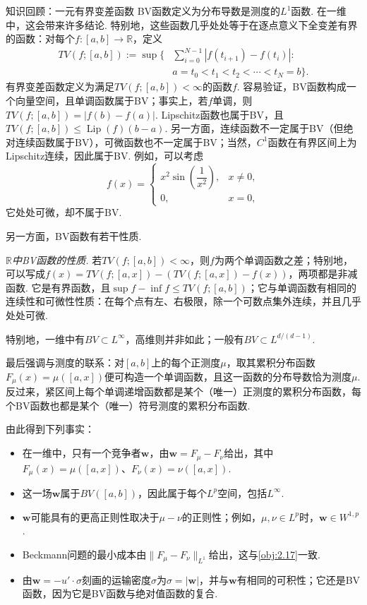 \begin{sourcebox}{知识回顾：一元有界变差函数}\label{box:4.4}
BV函数定义为分布导数是测度的$L^1$函数. 在一维中，这会带来许多结论. 特别地，这些函数几乎处处等于在逐点意义下全变差有界的函数：对每个$f:[a,b]\to\mathbb R$，定义
\begin{equation*}
\begin{aligned}
 TV(f;[a,b]):=\sup\biggl\{&\sum_{i=0}^{N-1}|f(t_{i+1})-f(t_i)|:\\
      &a=t_0<t_1<t_2<\cdots<t_N=b\biggr\}.
\end{aligned}
\end{equation*}
有界变差函数定义为满足$TV(f;[a,b])<\infty$的函数$f$. 容易验证，BV函数构成一个向量空间，且单调函数属于BV；事实上，若$f$单调，则$TV(f;[a,b])=|f(b)-f(a)|$. Lipschitz函数也属于BV，且$TV(f;[a,b])\leq\operatorname{Lip}(f)(b-a)$. 另一方面，连续函数不一定属于BV（但绝对连续函数属于BV），可微函数也不一定属于BV；当然，$C^1$函数在有界区间上为Lipschitz连续，因此属于BV. 例如，可以考虑
\[
 f(x)=\begin{cases}
 x^2\sin\left(\dfrac1{x^2}\right),&x\neq0,\\
 0,&x=0,
 \end{cases}
\]
它处处可微，却不属于BV.

另一方面，BV函数有若干性质.

\emph{$\mathbb R$中BV函数的性质.} 若$TV(f;[a,b])<\infty$，则$f$为两个单调函数之差；特别地，可以写成$f(x)=TV(f;[a,x])-(TV(f;[a,x])-f(x))$，两项都是非减函数. 它是有界函数，且$\sup f-\inf f\leq TV(f;[a,b])$；它与单调函数有相同的连续性和可微性性质：在每个点有左、右极限，除一个可数点集外连续，并且几乎处处可微.

特别地，一维中有$BV\subset L^\infty$，高维则并非如此；一般有$BV\subset L^{d/(d-1)}$.

最后强调与测度的联系：对$[a,b]$上的每个正测度$\mu$，取其累积分布函数$F_\mu(x)=\mu([a,x])$便可构造一个单调函数，且这一函数的分布导数恰为测度$\mu$. 反过来，紧区间上每个单调递增函数都是某个（唯一）正测度的累积分布函数，每个BV函数也都是某个（唯一）符号测度的累积分布函数.
\end{sourcebox}

由此得到下列事实：
\begin{itemize}
 \item 在一维中，只有一个竞争者$\mathbf w$，由$\mathbf w=F_\mu-F_\nu$给出，其中$F_\mu(x)=\mu([a,x])$、$F_\nu(x)=\nu([a,x])$.
 \item 这一场$\mathbf w$属于$BV([a,b])$，因此属于每个$L^p$空间，包括$L^\infty$.
 \item $\mathbf w$可能具有的更高正则性取决于$\mu-\nu$的正则性；例如，$\mu,\nu\in L^p$时，$\mathbf w\in W^{1,p}$.
 \item Beckmann问题的最小成本由$\|F_\mu-F_\nu\|_{L^1}$给出，这与\autoref{obj:2.17}一致.
 \item 由$\mathbf w=-u'\cdot\sigma$刻画的运输密度$\sigma$为$\sigma=|\mathbf w|$，并与$\mathbf w$有相同的可积性；它还是BV函数，因为它是BV函数与绝对值函数的复合.
\end{itemize}

